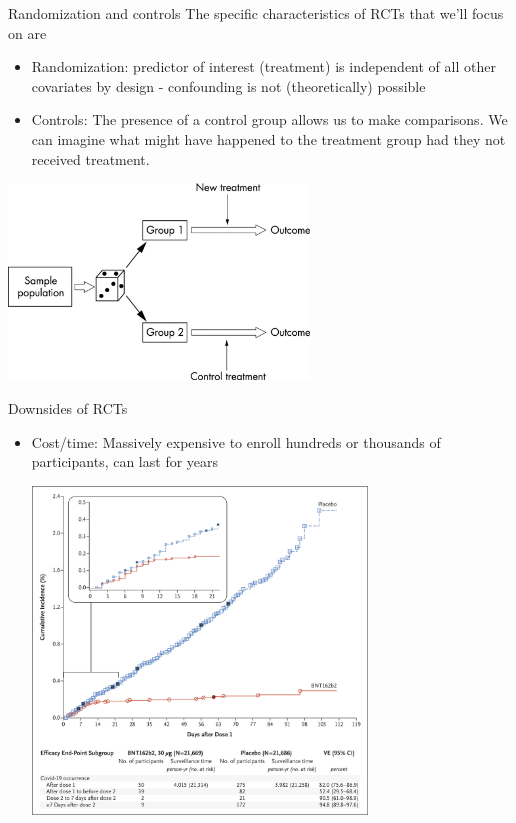 \documentclass[10pt,t]{beamer}
\begin{document}
\begin{frame}{Randomization and controls}
	The specific characteristics of RCTs that we'll focus on are
	\begin{itemize}
		\item Randomization: predictor of interest (treatment) is independent of all other covariates by design - confounding is not (theoretically) possible
		\item Controls: The presence of a control group allows us to make comparisons. We can imagine what might have happened to the treatment group had they not received treatment. 
	\end{itemize}
\begin{center}
	\includegraphics[width = 0.6\textwidth]{rct.jpg}
\end{center}
\end{frame}

\begin{frame}{Downsides of RCTs}
	\vspace{-0.8cm}
	\begin{itemize}
		\item Cost/time: Massively expensive to enroll hundreds or thousands of participants, can last for years
		\begin{center}
			\includegraphics[width = 0.7\textwidth]{pfizer.jpeg}
		\end{center}
	\end{itemize}
\end{frame}
\end{document}
